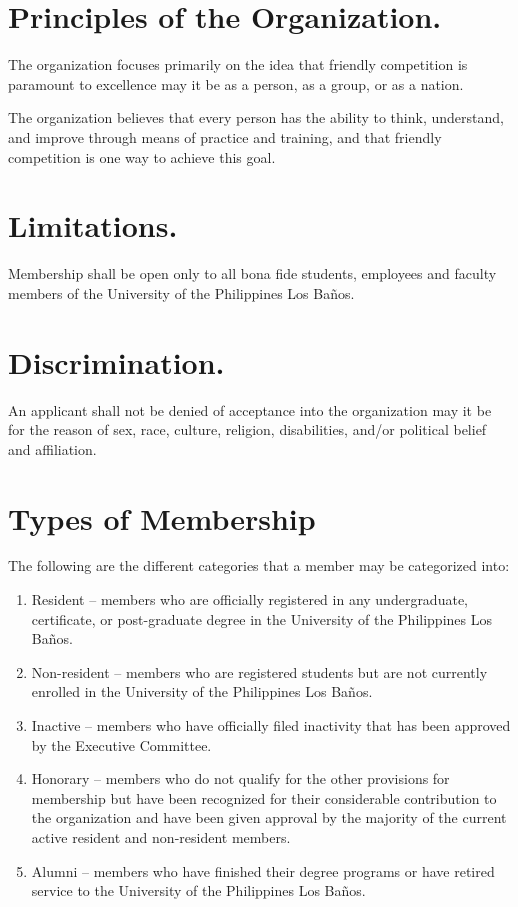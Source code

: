 \documentclass[12pt]{constitution}
\begin{document}
\section{Principles of the Organization.}
The organization focuses primarily on the idea that friendly competition is paramount to
excellence may it be as a person, as a group, or as a nation.

The organization believes that every person has the ability to think, understand, and improve
through means of practice and training,
and that friendly competition is one way to achieve this goal.

\section{Limitations.}
Membership shall be open only to all bona fide students, employees and faculty members of the
University of the Philippines Los Ba\~{n}os.

\section{Discrimination.}
An applicant shall not be denied of acceptance into the organization 
may it be for the reason of sex, race, culture, religion, disabilities, and/or political belief and affiliation.

\section{Types of Membership}
The following are the different categories that a member may be categorized into:
\begin{enumerate}
  \item Resident -- members who are officially registered in any undergraduate, certificate, or post-graduate degree in
  the University of the Philippines Los Ba\~{n}os.

  \item Non-resident -- members who are registered students but are not currently enrolled in the University of the
  Philippines Los Ba\~{n}os.

  \item Inactive -- members who have officially filed inactivity that has been approved by the Executive Committee.

  \item Honorary -- members who do not qualify for the other provisions for membership but have been recognized
  for their considerable contribution to the organization and have been given approval by the majority of the
  current active resident and non-resident members.

  \item Alumni -- members who have finished their degree programs or have retired service to the University of
  the Philippines Los Ba\~{n}os.
\end{enumerate}
\end{document}
